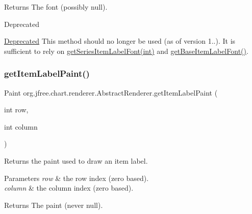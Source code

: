 \begin{DoxyReturn}{Returns}
The font (possibly {\ttfamily null}).
\end{DoxyReturn}
\begin{DoxyRefDesc}{Deprecated}
\item[\mbox{\hyperlink{deprecated__deprecated000131}{Deprecated}}]This method should no longer be used (as of version 1..). It is sufficient to rely on \mbox{\hyperlink{classorg_1_1jfree_1_1chart_1_1renderer_1_1_abstract_renderer_a541c5cf27a5e10f32716f802b7e6a392}{get\+Series\+Item\+Label\+Font(int)}} and \mbox{\hyperlink{classorg_1_1jfree_1_1chart_1_1renderer_1_1_abstract_renderer_aa6277326bc1ddd480515de060803b682}{get\+Base\+Item\+Label\+Font()}}. \end{DoxyRefDesc}
\mbox{\label{classorg_1_1jfree_1_1chart_1_1renderer_1_1_abstract_renderer_a93763c8ae33a08723fbe454d93cf1b5c}} 
\subsubsection{\texorpdfstring{get\+Item\+Label\+Paint()}{getItemLabelPaint()}\hspace{0.1cm}{\footnotesize\ttfamily [1/2]}}
{\footnotesize\ttfamily Paint org.\+jfree.\+chart.\+renderer.\+Abstract\+Renderer.\+get\+Item\+Label\+Paint (\begin{DoxyParamCaption}\item[{int}]{row,  }\item[{int}]{column }\end{DoxyParamCaption})}

Returns the paint used to draw an item label.


\begin{DoxyParams}{Parameters}
{\em row} & the row index (zero based). \\
\hline
{\em column} & the column index (zero based).\\
\hline
\end{DoxyParams}
\begin{DoxyReturn}{Returns}
The paint (never {\ttfamily null}). 
\end{DoxyReturn}
\mbox{\label{classorg_1_1jfree_1_1chart_1_1renderer_1_1_abstract_renderer_aa8e42806df8a95921d2e593462d1e758}} 
